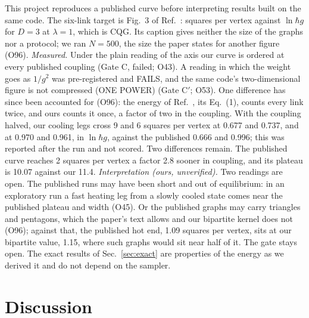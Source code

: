 \documentclass[aps,pre,10pt,twocolumn,superscriptaddress,nofootinbib]{revtex4-2}
\begin{document}
This project reproduces a published curve before interpreting results built on the same code. The six-link target
is Fig.~3 of Ref.~\cite{T22}: squares per vertex against $\ln \hbar g$ for $D = 3$ at $\lambda = 1$, which is CQG.
Its caption gives neither the size of the graphs nor a protocol; we ran $N = 500$, the size the paper states for
another figure (O96). \emph{Measured.} Under the plain reading of the axis our curve is ordered at every published
coupling (Gate C, failed; O43). A reading in which the weight goes as $1/g^2$ was pre-registered and FAILS, and the
same code's two-dimensional figure is not compressed (ONE POWER) (Gate C$'$; O53). One difference has since been
accounted for (O96): the energy of Ref.~\cite{T22}, its Eq.~(1), counts every link twice, and ours counts it once, a
factor of two in the coupling. With the coupling halved, our cooling legs cross 9 and 6 squares per vertex at 0.677 and 0.737, and at
0.970 and 0.961, in $\ln \hbar g$, against the published 0.666 and 0.996; this was reported after the run and not
scored. Two differences remain. The published curve reaches 2 squares per vertex a factor 2.8 sooner in coupling,
and its plateau is 10.07 against our 11.4. \emph{Interpretation (ours, unverified).} Two readings are open. The published runs may have been short and out of equilibrium: in an exploratory run a fast
heating leg from a slowly cooled state comes near the published plateau and width (O45). Or the published graphs may
carry triangles and pentagons, which the paper's text allows and our bipartite kernel does not (O96); against that,
the published hot end, 1.09 squares per vertex, sits at our bipartite value, 1.15, where such graphs would sit near
half of it. The gate stays open. The exact results of Sec.~\ref{sec:exact} are properties of the energy as we
derived it and do not depend on the sampler.

\section{Discussion}
\end{document}
